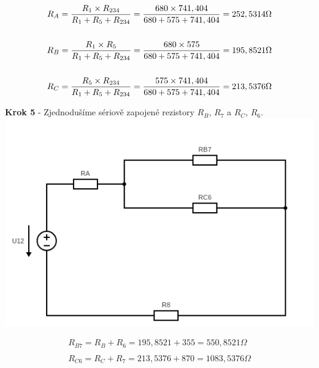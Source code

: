 \begin{gather*}
\newline
R_A = \frac{R_1 \times R_{234}}{R_1 + R_5 + R_{234}} = \frac{680 \times 741,404}{680 + 575 + 741,404} = 252,5314 \Omega \\\\
\newline
\newline
R_B = \frac{R_1 \times R_5}{R_1 + R_5 + R_{234}} = \frac{680 \times 575}{680 + 575 + 741,404} = 195,8521 \Omega \\\\
\newline
\newline
R_C = \frac{R_5 \times R_{234}}{R_1 + R_5 + R_{234}} = \frac{575 \times 741,404}{680 + 575 + 741,404} = 213,5376 \Omega
\newline
\end{gather*}
\vspace{1cm}

\begin{center}
\textbf{Krok 5} - Zjednodušíme sériově zapojené rezistory $R_B$, $R_7$ a $R_C$, $R_6$.
\includegraphics[scale=0.6,keepaspectratio]{fig/Pr1_steps/Pr1_step05.png} \\
\end{center}
\vspace{-0.3cm}

\begin{gather*}
R_{B7} = R_B + R_6 = 195,8521 + 355 = 550,8521 \Omega \\\\
R_{C6} = R_C + R_7 = 213,5376 + 870 = 1083,5376 \Omega
\end{gather*}


